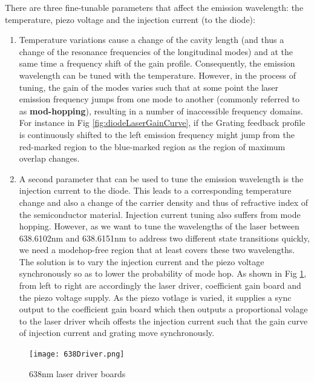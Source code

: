 \documentclass[12pt]{report}
\begin{document}
There are three fine-tunable parameters that affect the emission wavelength: the temperature, piezo voltage and the injection current (to the diode): 
\begin{enumerate}
    \item Temperature variations cause a change of the cavity length (and thus a change of the resonance frequencies of the longitudinal modes) and at the same time a frequency shift of the gain profile. Consequently, the emission wavelength can be tuned with the temperature. However, in the process of tuning, the gain of the modes varies such that at some point the laser emission frequency jumps from one mode to another (commonly referred to as \textbf{mod-hopping}), resulting in a number of inaccessible frequency domains. For instance in Fig \ref{fig:diodeLaserGainCurve}, if the Grating feedback profile is continuously shifted to the left emission frequency might jump from the red-marked region to the blue-marked region as the region of maximum overlap changes.

    \item A second parameter that can be used to tune the emission wavelength is the injection current to the diode. This leads to a corresponding temperature change and also a change of the carrier density and thus of refractive index of the semiconductor material. Injection current tuning also suffers from mode hopping. However, as we want to tune the wavelengths of the laser between 638.6102nm and 638.6151nm to address two different state transitions quickly, we need a modehop-free region that at least covers these two wavelengths. The solution is to vary the injection current and the piezo voltage synchronously so as to lower the probability of mode hop. As shown in Fig \ref{fig:638Driver}, from left to right are accordingly the laser driver, coefficient gain board and the piezo voltage supply. As the piezo votlage is varied, it supplies a sync output to the coefficient gain board which then outputs a proportional volage to the laser driver whcih offests the injection current such that the gain curve of injection current and grating move synchronously. 
\end{enumerate}

\begin{figure}[H]
    \centering
    \texttt{[image: 638Driver.png]}
    \caption{638nm laser driver boards}
    \label{fig:638Driver}
\end{figure}
 
\end{document}
